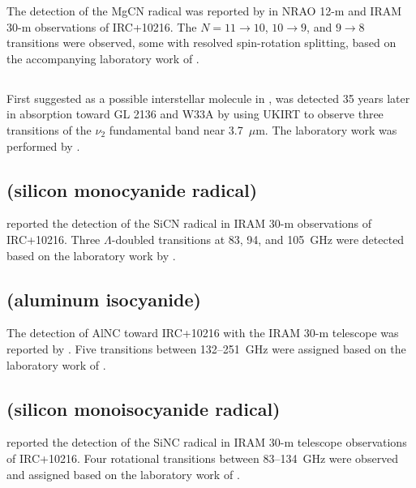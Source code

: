 \documentclass[twocolumn]{aastex631}
\begin{document}
	The detection of the MgCN radical was reported by \citet{Ziurys:1995pf} in NRAO 12-m and IRAM 30-m observations of IRC+10216.  The $N = 11\rightarrow10$, $10\rightarrow9$, and $9\rightarrow8$ transitions were observed, some with resolved spin-rotation splitting, based on the accompanying laboratory work of \citet{Anderson:1994if}.
	
	\subsection{}
	\label{H3+}
	
	First suggested as a possible interstellar molecule in \citet{Martin:1961wr},  was detected 35 years later in absorption toward GL 2136 and W33A by \citet{Geballe:1996iw} using UKIRT to observe three transitions of the $\nu_2$ fundamental band near 3.7~$\mu$m.  The laboratory work was performed by \citet{Oka:1980tr}.
	
	\subsection{ (silicon monocyanide radical)}
	\label{SiCN}
	
	\citet{Guelin:2000kl} reported the detection of the SiCN radical in IRAM 30-m observations of IRC+10216.  Three $\Lambda$-doubled transitions at 83, 94, and 105~GHz were detected based on the laboratory work by \citet{Apponi:2000re}.
	
	\subsection{ (aluminum isocyanide)}
	\label{AlNC}
	
	The detection of AlNC toward IRC+10216 with the IRAM 30-m telescope was reported by \citet{Ziurys:2002ds}.  Five transitions between 132--251~GHz were assigned based on the laboratory work of \citet{Robinson:1997bh}.
	
	\subsection{ (silicon monoisocyanide radical)}
	\label{SiNC}
	
	\citet{Guelin:2004cg} reported the detection of the SiNC radical in IRAM 30-m telescope observations of IRC+10216.  Four rotational transitions between 83--134~GHz were observed and assigned based on the laboratory work of \citet{Apponi:2000re}.
	
\end{document}
